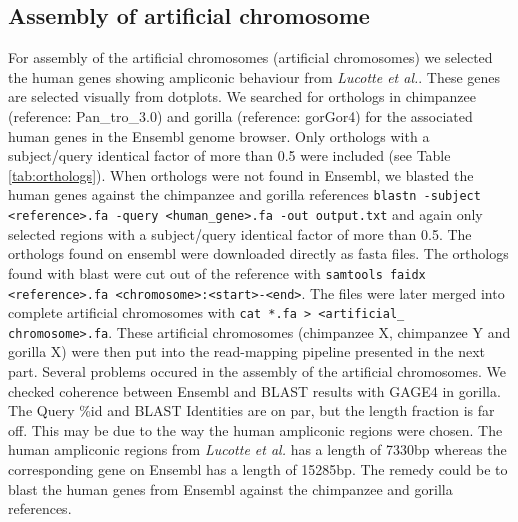 \documentclass[
journal=jacsat, %
manuscript=article]{achemso}
\begin{document}
\subsection{Assembly of artificial chromosome}
For assembly of the artificial chromosomes (artificial chromosomes) we selected the human genes showing ampliconic behaviour from \textit{Lucotte et al.\cite{LucotteDyn}}. These genes are selected visually from dotplots. We searched for orthologs in chimpanzee (reference: Pan\_tro\_3.0) and gorilla (reference: gorGor4) for the associated human genes in the Ensembl genome browser. Only orthologs with a subject/query identical factor of more than 0.5 were included (see Table \ref{tab:orthologs}). When orthologs were not found in Ensembl, we blasted the human genes against the chimpanzee and gorilla references \texttt{blastn -subject <reference>.fa -query <human\_gene>.fa -out output.txt} and again only selected regions with a subject/query identical factor of more than 0.5. The orthologs found on ensembl were downloaded directly as fasta files. The orthologs found with blast were cut out of the reference with \texttt{samtools faidx <reference>.fa <chromosome>:<start>-<end>}. The files were later merged into complete artificial chromosomes with \texttt{cat *.fa > <artificial\_ chromosome>.fa}. These artificial chromosomes (chimpanzee X, chimpanzee Y and gorilla X) were then put into the read-mapping pipeline presented in the next part. Several problems occured in the assembly of the artificial chromosomes. We checked coherence between Ensembl and BLAST results with GAGE4 in gorilla. The Query \%id and BLAST Identities are on par, but the length fraction is far off. This may be due to the way the human ampliconic regions were chosen. The human ampliconic regions from \textit{Lucotte et al.\cite{LucotteDyn}} has a length of 7330bp whereas the corresponding gene on Ensembl has a length of 15285bp. The remedy could be to blast the human genes from Ensembl against the chimpanzee and gorilla references.
\end{document}
